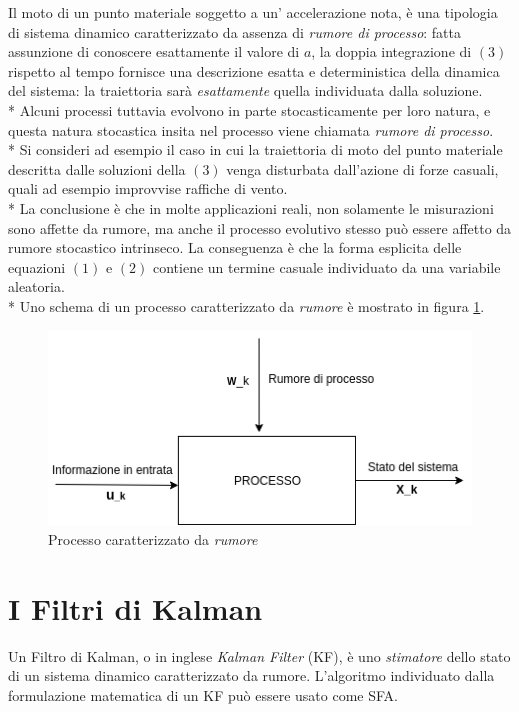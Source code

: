 Il moto di un punto materiale soggetto a un' accelerazione nota, \`e una tipologia di sistema dinamico caratterizzato da assenza di \emph{rumore di processo}: fatta assunzione di conoscere esattamente il valore di $a$, la doppia integrazione di $(3)$ rispetto al tempo fornisce una descrizione esatta e deterministica della dinamica del sistema: la traiettoria sar\`a \emph{esattamente} quella individuata dalla soluzione.\\*
Alcuni processi tuttavia evolvono in parte stocasticamente per loro natura, e questa natura stocastica insita nel processo viene chiamata \emph{rumore di processo}. \cite{kfbook}\\*
Si consideri ad esempio il caso in cui la traiettoria di moto del punto materiale descritta dalle soluzioni della $(3)$ venga disturbata dall'azione di forze casuali, quali ad esempio improvvise raffiche di vento.\\*
La conclusione \`e che in molte applicazioni reali, non solamente le misurazioni sono affette da rumore, ma anche il processo evolutivo stesso pu\`o essere affetto da rumore stocastico intrinseco. La conseguenza \`e che la forma esplicita delle equazioni $(1)$ e $(2)$ contiene un termine casuale individuato da una variabile aleatoria.\\*
Uno schema di un processo caratterizzato da \emph{rumore} \`e mostrato in figura \ref{fig:mimo1}.
\begin{figure}[h]
	\centering
	\includegraphics{img/mimo1}
	\caption{Processo caratterizzato da \emph{rumore}}
	\label{fig:mimo1}
\end{figure}
\section{I Filtri di Kalman}
Un Filtro di Kalman, o in inglese \emph{Kalman Filter} (KF), \`e uno \emph{stimatore} dello stato di un sistema dinamico caratterizzato da rumore. L'algoritmo individuato dalla formulazione matematica di un KF pu\`o essere usato come SFA.
